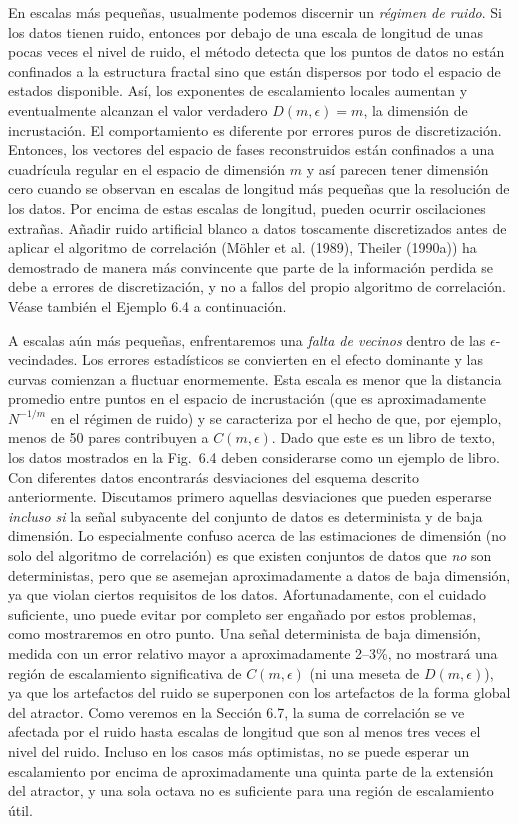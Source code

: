 \documentclass[10pt,a4paper]{book}
\begin{document}
\bigskip

En escalas más pequeñas, usualmente podemos discernir un \textit{régimen de ruido}. Si los datos tienen ruido, entonces por debajo de una escala de longitud de unas pocas veces el nivel de ruido, el método detecta que los puntos de datos no están confinados a la estructura fractal sino que están dispersos por todo el espacio de estados disponible. Así, los exponentes de escalamiento locales aumentan y eventualmente alcanzan el valor verdadero $D(m, \epsilon) = m$, la dimensión de incrustación. El comportamiento es diferente por errores puros de discretización. Entonces, los vectores del espacio de fases reconstruidos están confinados a una cuadrícula regular en el espacio de dimensión $m$ y así parecen tener dimensión cero cuando se observan en escalas de longitud más pequeñas que la resolución de los datos. Por encima de estas escalas de longitud, pueden ocurrir oscilaciones extrañas. Añadir ruido artificial blanco a datos toscamente discretizados antes de aplicar el algoritmo de correlación (Möhler et al. (1989), Theiler (1990a)) ha demostrado de manera más convincente que parte de la información perdida se debe a errores de discretización, y no a fallos del propio algoritmo de correlación. Véase también el Ejemplo 6.4 a continuación.

\bigskip

A escalas aún más pequeñas, enfrentaremos una \textit{falta de vecinos} dentro de las $\epsilon$-vecindades. Los errores estadísticos se convierten en el efecto dominante y las curvas comienzan a fluctuar enormemente. Esta escala es menor que la distancia promedio entre puntos en el espacio de incrustación (que es aproximadamente $N^{-1/m}$ en el régimen de ruido) y se caracteriza por el hecho de que, por ejemplo, menos de 50 pares contribuyen a $C(m, \epsilon)$. Dado que este es un libro de texto, los datos mostrados en la Fig.~6.4 deben considerarse como un ejemplo de libro. Con diferentes datos encontrarás desviaciones del esquema descrito anteriormente. Discutamos primero aquellas desviaciones que pueden esperarse \textit{incluso si} la señal subyacente del conjunto de datos es determinista y de baja dimensión. Lo especialmente confuso acerca de las estimaciones de dimensión (no solo del algoritmo de correlación) es que existen conjuntos de datos que \textit{no} son deterministas, pero que se asemejan aproximadamente a datos de baja dimensión, ya que violan ciertos requisitos de los datos. Afortunadamente, con el cuidado suficiente, uno puede evitar por completo ser engañado por estos problemas, como mostraremos en otro punto. Una señal determinista de baja dimensión, medida con un error relativo mayor a aproximadamente 2--3\%, no mostrará una región de escalamiento significativa de $C(m, \epsilon)$ (ni una meseta de $D(m, \epsilon)$), ya que los artefactos del ruido se superponen con los artefactos de la forma global del atractor. Como veremos en la Sección 6.7, la suma de correlación se ve afectada por el ruido hasta escalas de longitud que son al menos tres veces el nivel del ruido. Incluso en los casos más optimistas, no se puede esperar un escalamiento por encima de aproximadamente una quinta parte de la extensión del atractor, y una sola octava no es suficiente para una región de escalamiento útil.
\end{document}
